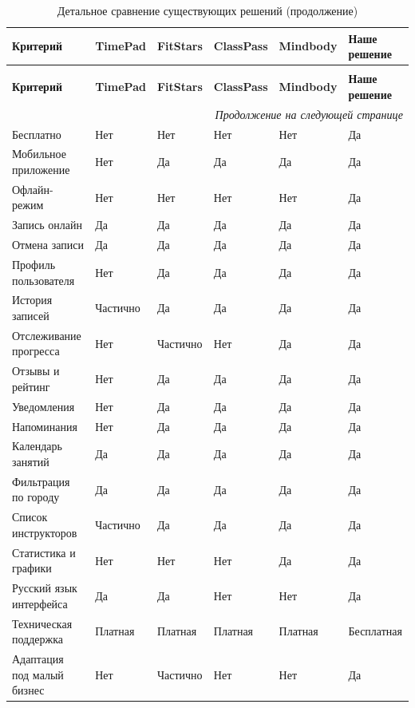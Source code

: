 \renewcommand{\arraystretch}{1.3}
\begin{longtable}{|p{3cm}|p{2.2cm}|p{2.2cm}|p{2.2cm}|p{2.2cm}|p{2.2cm}|}
	\caption{Детальное сравнение существующих решений}
	\label{tab:comparison_detailed} \\
	\hline
	\textbf{Критерий} & \textbf{TimePad} & \textbf{FitStars} & \textbf{ClassPass} & \textbf{Mindbody} & \textbf{Наше решение} \\
	\hline
	\endfirsthead
	
	\caption{Детальное сравнение существующих решений (продолжение)} \\
	\hline
	\textbf{Критерий} & \textbf{TimePad} & \textbf{FitStars} & \textbf{ClassPass} & \textbf{Mindbody} & \textbf{Наше решение} \\
	\hline
	\endhead
	
	\hline
	\multicolumn{6}{r}{\textit{Продолжение на следующей странице}} \\
	\endfoot
	
	\hline
	\endlastfoot
	
	Бесплатно & Нет & Нет & Нет & Нет & Да \\
	\hline
	Мобильное приложение & Нет & Да & Да & Да & Да \\
	\hline
	Офлайн-режим & Нет & Нет & Нет & Нет & Да \\
	\hline
	Запись онлайн & Да & Да & Да & Да & Да \\
	\hline
	Отмена записи & Да & Да & Да & Да & Да \\
	\hline
	Профиль пользователя & Нет & Да & Да & Да & Да \\
	\hline
	История записей & Частично & Да & Да & Да & Да \\
	\hline
	Отслеживание прогресса & Нет & Частично & Нет & Да & Да \\
	\hline
	Отзывы и рейтинг & Нет & Да & Да & Да & Да \\
	\hline
	Уведомления & Нет & Да & Да & Да & Да \\
	\hline
	Напоминания & Нет & Да & Да & Да & Да \\
	\hline
	Календарь занятий & Да & Да & Да & Да & Да \\
	\hline
	Фильтрация по городу & Да & Да & Да & Да & Да \\
	\hline
	Список инструкторов & Частично & Да & Да & Да & Да \\
	\hline
	Статистика и графики & Нет & Нет & Нет & Да & Да \\
	\hline
	Русский язык интерфейса & Да & Да & Нет & Нет & Да \\
	\hline
	Техническая поддержка & Платная & Платная & Платная & Платная & Бесплатная \\
	\hline
	Адаптация под малый бизнес & Нет & Частично & Нет & Нет & Да \\
	\hline
\end{longtable}
\renewcommand{\arraystretch}{1}

